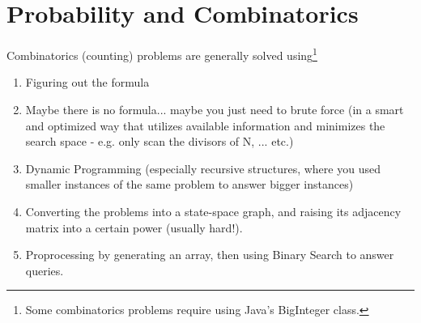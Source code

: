 \documentclass[12pt]{book}
\begin{document}
\chapter{Probability and Combinatorics}
Combinatorics (counting) problems are generally solved using\footnote{Some combinatorics problems require using Java's BigInteger class.}
\begin{enumerate}[label = \roman*.]
\item Figuring out the formula
\item Maybe there is no formula... maybe you just need to brute force (in a smart and optimized way that utilizes available information and minimizes the search space - e.g. only scan the divisors of N, ... etc.)
\item Dynamic Programming (especially recursive structures, where you used smaller instances of the same problem to answer bigger instances)
\item Converting the problems into a state-space graph, and raising its adjacency matrix into a certain power (usually hard!).
\item Proprocessing by generating an array, then using Binary Search to answer queries.
\end{enumerate}
\end{document}
